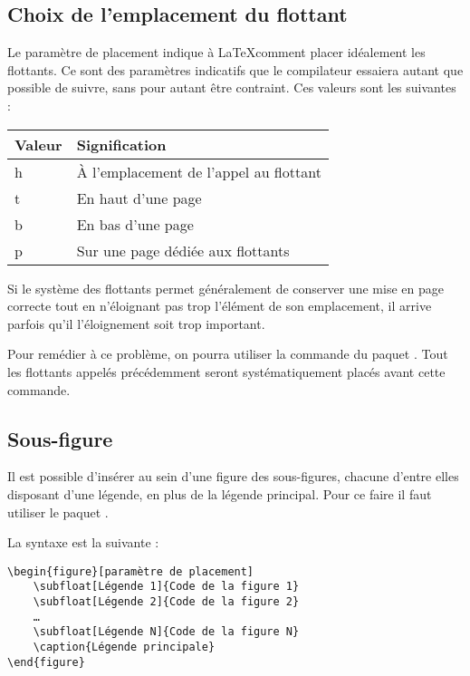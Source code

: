 \subsection{Choix de l'emplacement du flottant}

Le paramètre de placement indique à \LaTeX comment placer idéalement les flottants. Ce sont des paramètres indicatifs que le compilateur essaiera autant que possible de suivre, sans pour autant être contraint. Ces valeurs sont les suivantes :

\begin{longtable}{l|l}
	Valeur & Signification	\\
	\hline
	\endhead
	h 	& À l'emplacement de l'appel au flottant 	\\
	t 	& En haut d'une page				\\
	b 	& En bas d'une page				\\
	p 	& Sur une page dédiée aux flottants		\\
\end{longtable}


Si le système des flottants permet généralement de conserver une mise en page correcte tout en n'éloignant pas trop l'élément de son emplacement, il arrive parfois qu'il l'éloignement soit trop important.

Pour remédier à ce problème, on pourra utiliser la commande  du paquet . 
Tout les flottants appelés précédemment seront systématiquement placés avant cette commande.

\subsection{Sous-figure}

Il est possible d'insérer au sein d'une figure des sous-figures, chacune d'entre elles disposant d'une légende, en plus de la légende principal.
Pour ce faire il faut utiliser le paquet .

La syntaxe est la suivante :  
\begin{verbatim}
\begin{figure}[paramètre de placement]
	\subfloat[Légende 1]{Code de la figure 1}
	\subfloat[Légende 2]{Code de la figure 2}
	…
	\subfloat[Légende N]{Code de la figure N}
	\caption{Légende principale}
\end{figure} 
\end{verbatim}


	